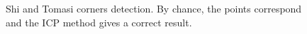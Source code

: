 \begin{figure}[htbp]
\centering\caption{Shi and Tomasi corners detection. By chance, the points correspond and the ICP method gives a correct result.}%
 \hfill
 \label{fig:registration:python:harris}%
\end{figure}
